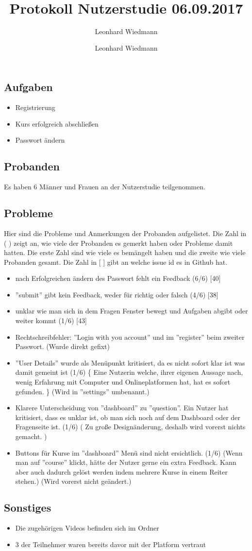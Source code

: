 \documentclass[colorback, accentcolor=tud1c, paper=a4]{tudexercise}
\title{Protokoll Nutzerstudie 06.09.2017}
\subtitle{Leonhard Wiedmann}
\author{Leonhard Wiedmann}
\begin{document}
\maketitle
\subsection*{Aufgaben}
\begin{itemize}
	\item Registrierung
	\item Kurs erfolgreich abschließen
	\item Passwort ändern
\end{itemize}

\subsection*{Probanden}
Es haben 6 Männer und Frauen an der Nutzerstudie teilgenommen.

\subsection*{Probleme}
  Hier sind die Probleme und Anmerkungen der Probanden aufgelistet. Die Zahl in ( ) zeigt an, wie viele der Probanden es gemerkt haben oder Probleme damit hatten. Die erste Zahl sind wie viele es bemängelt haben und die zweite wie viele Probanden gesamt. Die Zahl in [ ] gibt an welche issue id es in Github hat.
  \begin{itemize}
	  \item nach Erfolgreichen ändern des Passwort fehlt ein Feedback (6/6) [40]
		\item ''submit'' gibt kein Feedback, weder für richtig oder falsch (4/6) [38]
		\item unklar wie man sich in dem Fragen Fenster bewegt und Aufgaben abgibt oder weiter kommt (1/6) [43]
		\item Rechtschreibfehler: ''Login with you account'' und im ''register'' beim zweiter Passwort. (Wurde direkt gefixt)
		\item ''User Details'' wurde als Menüpunkt kritisiert, da es nicht sofort klar ist was damit gemeint ist (1/6) \{ Eine Nutzerin welche, ihrer eigenen Aussage nach, wenig Erfahrung mit Computer und Onlineplatformen hat, hat es sofort gefunden. \} (Wird in ''settings'' umbenannt.)
		\item Klarere Unterscheidung von ''dashboard'' zu ''question''. Ein Nutzer hat kritisiert, dass es unklar ist, ob man sich noch auf dem Dashboard oder der Fragenseite ist. (1/6) ( Zu große Designänderung, deshalb wird vorerst nichts gemacht. )
    \item Buttons für Kurse im ''dashboard'' Menü sind nicht ersichtlich. (1/6) (Wenn man auf ''course'' klickt, hätte der Nutzer gerne ein extra Feedback. Kann aber auch dadurch gelöst werden indem mehrere Kurse in einem Reiter stehen.) (Wird vorerst nicht geändert.)
   \end{itemize}

 \subsection*{Sonstiges}
 	\begin{itemize}
		\item Die zugehörigen Videos befinden sich im Ordner
		\item 3 der Teilnehmer waren bereits davor mit der Platform vertraut
	\end{itemize}
\end{document}
